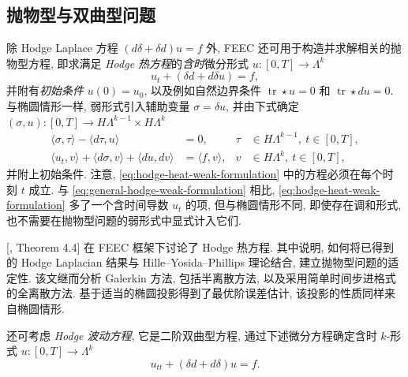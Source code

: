 \subsection{{抛物型与双曲型问题}}\label{sec:parabolic-hyperbolic}

{除 Hodge Laplace 方程 $(d\delta+\delta d)u=f$ 外, FEEC 还可用于构造并求解相关的抛物型方程, 即求满足 \emph{Hodge 热方程}的\emph{含时}微分形式 $u:[0,T]\to\Lambda^k$}
\begin{equation}\label{eq:hodge-heat-equation}
u_t+(\delta d+d\delta u)=f,
\end{equation}
{并附有\emph{初始条件} $u(0)=u_0$, 以及例如自然边界条件 $\operatorname{tr}\star u=0$ 和 $\operatorname{tr}\star du=0$. 与椭圆情形一样, 弱形式引入辅助变量 $\sigma=\delta u$, 并由下式确定 $(\sigma,u):[0,T]\to H\Lambda^{k-1}\times H\Lambda^k$}
\begin{equation}\label{eq:hodge-heat-weak-formulation}
\begin{aligned}
\langle\sigma,\tau\rangle-\langle d\tau,u\rangle&=0,&\tau&\in H\Lambda^{k-1},\ t\in[0,T],\\
\langle u_t,v\rangle+\langle d\sigma,v\rangle+\langle du,dv\rangle&=\langle f,v\rangle,&v&\in H\Lambda^k,\ t\in[0,T],
\end{aligned}
\end{equation}
{并附上初始条件. 注意, \eqref{eq:hodge-heat-weak-formulation} 中的方程必须在每个时刻 $t$ 成立. 与 \eqref{eq:general-hodge-weak-formulation} 相比, \eqref{eq:hodge-heat-weak-formulation} 多了一个含时间导数 $u_t$ 的项, 但与椭圆情形不同, 即使存在调和形式, 也不需要在抛物型问题的弱形式中显式计入它们.}

{[, Theorem 4.4] 在 FEEC 框架下讨论了 Hodge 热方程. 其中说明, 如何将已得到的 Hodge Laplacian 结果与 Hille–Yosida–Phillips 理论结合, 建立抛物型问题的适定性. 该文继而分析 Galerkin 方法, 包括半离散方法, 以及采用简单时间步进格式的全离散方法. 基于适当的椭圆投影得到了最优阶误差估计, 该投影的性质同样来自椭圆情形.}

{还可考虑 \emph{Hodge 波动方程}, 它是二阶双曲型方程, 通过下述微分方程确定含时 $k$-形式 $u:[0,T]\to\Lambda^k$}
\begin{equation}\label{eq:hodge-wave-equation}
u_{tt}+(\delta d+d\delta)u=f.
\end{equation}

